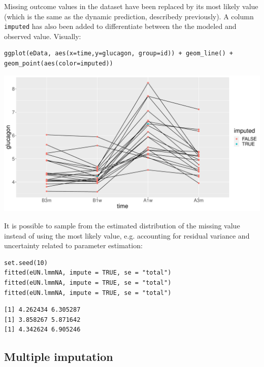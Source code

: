 \documentclass[12pt]{article}
\begin{document}
Missing outcome values in the dataset have been replaced by its most
likely value (which is the same as the dynamic prediction, describedy
previously). A column \texttt{imputed} has also been added to differentiate
between the the modeled and observed value. Visually:
\lstset{language=r,label= ,caption= ,captionpos=b,numbers=none}
\begin{lstlisting}
ggplot(eData, aes(x=time,y=glucagon, group=id)) + geom_line() + geom_point(aes(color=imputed))
\end{lstlisting}

\begin{center}
\includegraphics[trim={0 0 0 0},width=1\textwidth]{./figures/imputation.pdf}
\end{center}

It is possible to sample from the estimated distribution of the
missing value instead of using the most likely value, e.g. accounting
for residual variance and uncertainty related to parameter estimation:
\lstset{language=r,label= ,caption= ,captionpos=b,numbers=none}
\begin{lstlisting}
set.seed(10)
fitted(eUN.lmmNA, impute = TRUE, se = "total")
fitted(eUN.lmmNA, impute = TRUE, se = "total")
fitted(eUN.lmmNA, impute = TRUE, se = "total")
\end{lstlisting}

\begin{verbatim}
[1] 4.262434 6.305287
[1] 3.858267 5.871642
[1] 4.342624 6.905246
\end{verbatim}


\clearpage

\subsection{Multiple imputation}
\label{sec:orgfb2655f}
\end{document}
